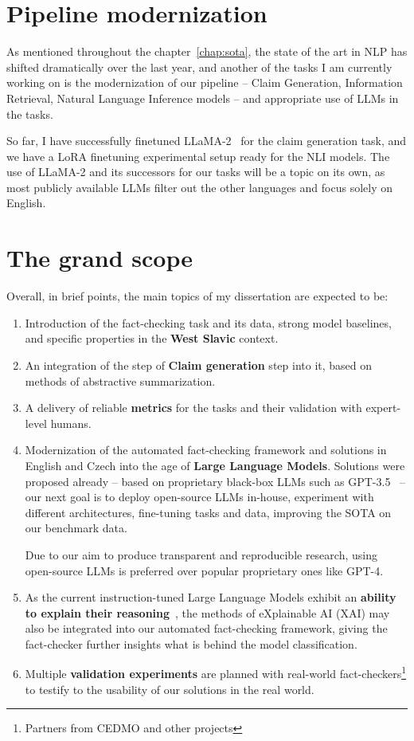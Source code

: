 \section{Pipeline modernization}
As mentioned throughout the chapter~\ref{chap:sota}, the state of the art in NLP has shifted dramatically over the last year, and another of the tasks I am currently working on is the modernization of our pipeline -- Claim Generation, Information Retrieval, Natural Language Inference models -- and appropriate use of LLMs in the tasks.

So far, I have successfully finetuned LLaMA-2~\cite{llama2} for the claim generation task, and we have a LoRA finetuning experimental setup ready for the NLI models.
The use of LLaMA-2 and its successors for our tasks will be a topic on its own, as most publicly available LLMs filter out the other languages and focus solely on English.

\section{The grand scope}
Overall, in brief points, the main topics of my dissertation are expected to be:
\begin{enumerate}
    \item Introduction of the fact-checking task and its data, strong model baselines, and specific properties in the \textbf{West Slavic} context.
    \item An integration of the step of \textbf{Claim generation} step into it, based on methods of abstractive summarization.
    \item A delivery of reliable \textbf{metrics} for the tasks and their validation with expert-level humans.
    \item Modernization of the automated fact-checking framework and solutions in English and Czech into the age of \textbf{Large Language Models}.
    Solutions were proposed already -- based on proprietary black-box LLMs such as GPT-3.5~\cite{bing} -- our next goal is to deploy open-source LLMs in-house, experiment with different architectures, fine-tuning tasks and data, improving the SOTA on our benchmark data.

    Due to our aim to produce transparent and reproducible research, using open-source LLMs is preferred over popular proprietary ones like GPT-4.
    \item As the current instruction-tuned Large Language Models exhibit an \textbf{ability to explain their reasoning}~\cite{SAEED2023110273}, the methods of eXplainable AI (XAI) may also be integrated into our automated fact-checking framework, giving the fact-checker further insights what is behind the model classification.
    \item Multiple \textbf{validation experiments} are planned with real-world fact-checkers\footnote{Partners from CEDMO and other projects} to testify to the usability of our solutions in the real world.
\end{enumerate}